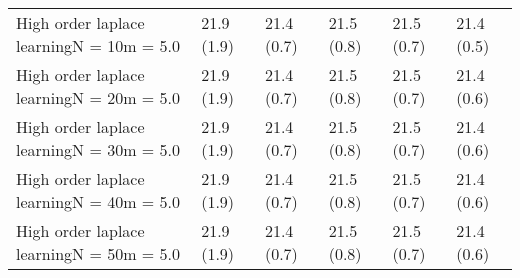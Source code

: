 \documentclass{article}
\begin{document}
\begin{table*}[t!]
\begin{center}
\begin{small}
\begin{sc}
\begin{tabular}{llllll}
High order laplace learningN = 10m = 5.0&21.9 (1.9)      &21.4 (0.7)      &21.5 (0.8)      &21.5 (0.7)      &21.4 (0.5)      \\
High order laplace learningN = 20m = 5.0&21.9 (1.9)      &21.4 (0.7)      &21.5 (0.8)      &21.5 (0.7)      &21.4 (0.6)      \\
High order laplace learningN = 30m = 5.0&21.9 (1.9)      &21.4 (0.7)      &21.5 (0.8)      &21.5 (0.7)      &21.4 (0.6)      \\
High order laplace learningN = 40m = 5.0&21.9 (1.9)      &21.4 (0.7)      &21.5 (0.8)      &21.5 (0.7)      &21.4 (0.6)      \\
High order laplace learningN = 50m = 5.0&21.9 (1.9)      &21.4 (0.7)      &21.5 (0.8)      &21.5 (0.7)      &21.4 (0.6)      \\
\bottomrule
\end{tabular}
\end{sc}
\end{small}
\end{center}
\vskip -0.1in
\end{table*}
\end{document}
